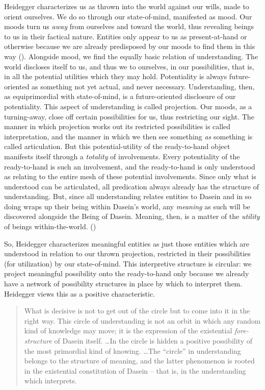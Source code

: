 \documentclass[leqno, 12pt]{turabian-researchpaper}
\begin{document}
	Heidegger characterizes us as thrown into the world against our wills, made to
	orient ourselves. We do so through our state-of-mind, manifested as mood. Our moods
	turn us \emph{away} from ourselves and toward the world, thus revealing beings
	to us in their factical nature. Entities only appear to us as present-at-hand
	or otherwise because we are already predisposed by our moods to find them in
	this way (). Alongside mood, we find the
	equally basic relation of understanding. The world discloses itself to us, and
	thus we to ourselves, in our possibilities, that is, in all the potential utilities
	which they may hold. Potentiality is always future-oriented as something not
	yet actual, and never necessary. Understanding, then, as equiprimordial with
	state-of-mind, is a future-oriented disclosure of our potentiality. This
	aspect of understanding is called projection. Our moods, as a turning-away, close
	off certain possibilities for us, thus restricting our sight. The manner in which
	projection works out its restricted possibilities is called interpretation,
	and the manner in which we then see something \emph{as} something is called articulation.
	But this potential-utility of the ready-to-hand object manifests itself
	through a \emph{totality} of involvements. Every potentiality of the ready-to-hand
	is such an involvement, and the ready-to-hand is only understood as relating to
	the entire mesh of these potential involvements. Since only what is understood
	can be articulated, all predication always already has the structure of understanding.
	But, since all understanding relates entities to Dasein and in so doing wraps up
	their being within Dasein's world, any \emph{meaning} as such will be discovered
	alongside the Being of Dasein. Meaning, then, is a matter of the \emph{utility}
	of beings within-the-world. ()

	So, Heidegger characterizes meaningful entities as just those entities which are
	understood in relation to our thrown projection, restricted in their
	possibilities (for utilization) by our state-of-mind. This interpretive structure
	is circular: we project meaningful possibility onto the ready-to-hand only
	because we already have a network of possibility structures in place by which
	to interpret them. Heidegger views this as a positive characteristic.
	\blockquote[{\cite[153]{heidegger2008b}}]{What is decisive is not to get out of the circle but to come into it in the right way. This circle of understanding is not an orbit in which any random kind of knowledge may move; it is the expression of the existential \emph{fore-structure} of Dasein itself. \dots In the circle is hidden a positive possibility of the most primordial kind of knowing. \dots The \enquote{circle} in understanding belongs to the structure of meaning, and the latter phenomenon is rooted in the existential constitution of Dasein -- that is, in the understanding which interprets.}
\end{document}
